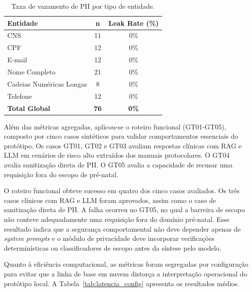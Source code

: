 \documentclass[12pt]{article}
\begin{document}
\begin{table}[H]
  \centering
  \caption{Taxa de vazamento de PII por tipo de entidade.}
  \label{tab:pii_leak}
  \small
  \begin{tabular}{lcc}
  	\toprule
	\textbf{Entidade} 	 	                & \textbf{n} 		                & \textbf{Leak Rate (\%)} \\
	\midrule
  	CNS     			                      & 11                            & 0\%                   \\
  	CPF                                 & 12                            & 0\%                   \\
  	E-mail                              & 12                            & 0\%                   \\
  	Nome Completo			                  & 21                            & 0\%                   \\
  	Cadeias Numéricas Longas            & 8                             & 0\%                   \\
  	Telefone                            & 12                            & 0\%                   \\
	\midrule
  	\textbf{Total Global}               & \textbf{76}                   & \textbf{0\%}          \\
  	\bottomrule
  \end{tabular}
  \end{table}
 
Além das métricas agregadas, aplicou-se o roteiro funcional (GT01-GT05), composto por cinco casos sintéticos para validar comportamentos essenciais do protótipo.
Os casos GT01, GT02 e GT03 avaliam respostas clínicas com RAG e LLM em cenários de risco alto extraídos dos manuais protocolares.
O GT04 avalia sanitização direta de PII.
O GT05 avalia a capacidade de recusar uma requisição fora do escopo de pré-natal.

O roteiro funcional obteve sucesso em quatro dos cinco casos avaliados.
Os três casos clínicos com RAG e LLM foram aprovados, assim como o caso de sanitização direta de PII.
A falha ocorreu no GT05, no qual a barreira de escopo não conteve adequadamente uma requisição fora do domínio pré-natal.
Esse resultado indica que a segurança comportamental não deve depender apenas de \textit{system prompts} e o módulo de privacidade deve incorporar verificações determinísticas ou classificadores de escopo antes da síntese pelo modelo.

Quanto à eficiência computacional, as métricas foram segregadas por configuração para evitar que a linha de base em nuvem distorça a interpretação operacional do protótipo local. A Tabela~\ref{tab:latencia_config} apresenta os resultados médios.
\end{document}
